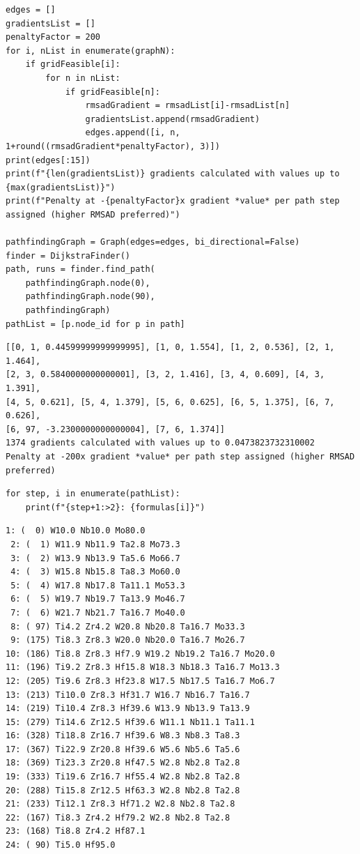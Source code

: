 \begin{verbatim}
edges = []
gradientsList = []
penaltyFactor = 200
for i, nList in enumerate(graphN):
    if gridFeasible[i]:
        for n in nList:
            if gridFeasible[n]:
                rmsadGradient = rmsadList[i]-rmsadList[n]
                gradientsList.append(rmsadGradient)
                edges.append([i, n, 1+round((rmsadGradient*penaltyFactor), 3)])
print(edges[:15])
print(f"{len(gradientsList)} gradients calculated with values up to {max(gradientsList)}")
print(f"Penalty at -{penaltyFactor}x gradient *value* per path step assigned (higher RMSAD preferred)")

pathfindingGraph = Graph(edges=edges, bi_directional=False)
finder = DijkstraFinder()
path, runs = finder.find_path(
    pathfindingGraph.node(0), 
    pathfindingGraph.node(90), 
    pathfindingGraph)
pathList = [p.node_id for p in path]
\end{verbatim}

\begin{verbatim}
[[0, 1, 0.44599999999999995], [1, 0, 1.554], [1, 2, 0.536], [2, 1, 1.464], 
[2, 3, 0.5840000000000001], [3, 2, 1.416], [3, 4, 0.609], [4, 3, 1.391], 
[4, 5, 0.621], [5, 4, 1.379], [5, 6, 0.625], [6, 5, 1.375], [6, 7, 0.626], 
[6, 97, -3.2300000000000004], [7, 6, 1.374]]
1374 gradients calculated with values up to 0.0473823732310002
Penalty at -200x gradient *value* per path step assigned (higher RMSAD preferred)
\end{verbatim}

\begin{verbatim}
for step, i in enumerate(pathList):
    print(f"{step+1:>2}: {formulas[i]}")
\end{verbatim}

\begin{verbatim}
1: (  0) W10.0 Nb10.0 Mo80.0 
 2: (  1) W11.9 Nb11.9 Ta2.8 Mo73.3 
 3: (  2) W13.9 Nb13.9 Ta5.6 Mo66.7 
 4: (  3) W15.8 Nb15.8 Ta8.3 Mo60.0 
 5: (  4) W17.8 Nb17.8 Ta11.1 Mo53.3 
 6: (  5) W19.7 Nb19.7 Ta13.9 Mo46.7 
 7: (  6) W21.7 Nb21.7 Ta16.7 Mo40.0 
 8: ( 97) Ti4.2 Zr4.2 W20.8 Nb20.8 Ta16.7 Mo33.3 
 9: (175) Ti8.3 Zr8.3 W20.0 Nb20.0 Ta16.7 Mo26.7 
10: (186) Ti8.8 Zr8.3 Hf7.9 W19.2 Nb19.2 Ta16.7 Mo20.0 
11: (196) Ti9.2 Zr8.3 Hf15.8 W18.3 Nb18.3 Ta16.7 Mo13.3 
12: (205) Ti9.6 Zr8.3 Hf23.8 W17.5 Nb17.5 Ta16.7 Mo6.7 
13: (213) Ti10.0 Zr8.3 Hf31.7 W16.7 Nb16.7 Ta16.7 
14: (219) Ti10.4 Zr8.3 Hf39.6 W13.9 Nb13.9 Ta13.9 
15: (279) Ti14.6 Zr12.5 Hf39.6 W11.1 Nb11.1 Ta11.1 
16: (328) Ti18.8 Zr16.7 Hf39.6 W8.3 Nb8.3 Ta8.3 
17: (367) Ti22.9 Zr20.8 Hf39.6 W5.6 Nb5.6 Ta5.6 
18: (369) Ti23.3 Zr20.8 Hf47.5 W2.8 Nb2.8 Ta2.8 
19: (333) Ti19.6 Zr16.7 Hf55.4 W2.8 Nb2.8 Ta2.8 
20: (288) Ti15.8 Zr12.5 Hf63.3 W2.8 Nb2.8 Ta2.8 
21: (233) Ti12.1 Zr8.3 Hf71.2 W2.8 Nb2.8 Ta2.8 
22: (167) Ti8.3 Zr4.2 Hf79.2 W2.8 Nb2.8 Ta2.8 
23: (168) Ti8.8 Zr4.2 Hf87.1 
24: ( 90) Ti5.0 Hf95.0 
\end{verbatim}


